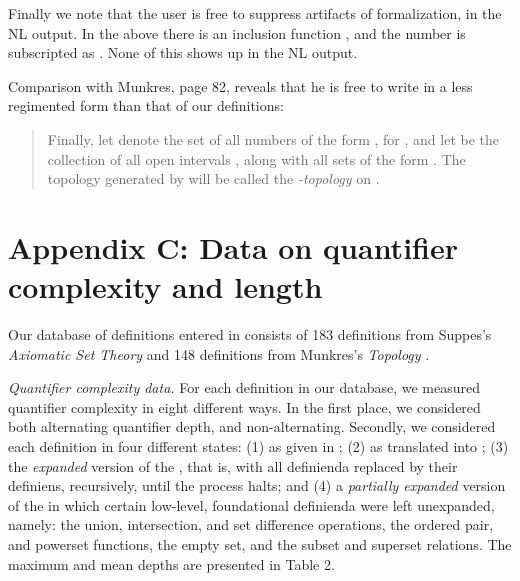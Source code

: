 \documentclass{llncs}
\begin{document}
Finally we note that the user is free to suppress artifacts of
formalization, in the NL output. In the  above there is an
inclusion function , and the number  is
subscripted as . None of this shows up in the NL
output.

\medskip Comparison with Munkres, page 82, reveals that he is free to
write in a less regimented form than that of our definitions:
\begin{quote}
  Finally, let  denote the set of all numbers of the form ,
  for , and let  be the collection
  of all open intervals , along with all sets of the form
  . The topology generated by  will be
  called the \emph{-topology} on .
\end{quote}

\section*{Appendix C: Data on quantifier complexity and length}

Our database of definitions entered in  consists of 183
definitions from Suppes's \emph{Axiomatic Set Theory} \cite{suppes}
and 148 definitions from Munkres's \emph{Topology} \cite{munkres}.

\medskip

\noindent \emph{Quantifier complexity data.} For each definition in
our database, we measured quantifier complexity in eight different
ways. In the first place, we considered both alternating quantifier
depth, and non-alternating. Secondly, we considered each definition in
four different states: (1) as given in ; (2) as translated
into ; (3) the \emph{expanded} version of the ,
that is, with all definienda replaced by their definiens, recursively,
until the process halts; and (4) a \emph{partially expanded} version
of the  in which certain low-level, foundational definienda
were left unexpanded, namely: the union, intersection, and set
difference operations, the ordered pair, and powerset functions, the
empty set, and the subset and superset relations. The maximum and mean
depths are presented in Table 2.
\end{document}
